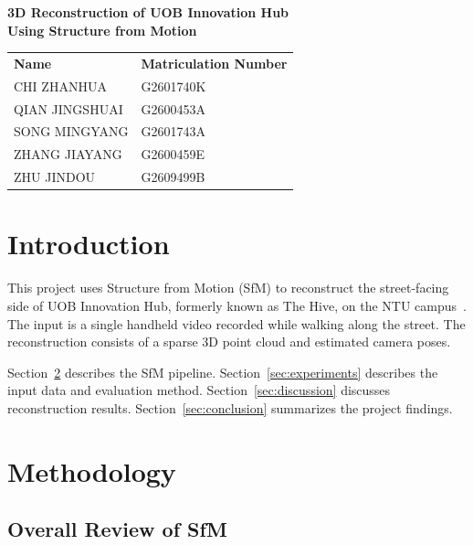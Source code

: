 \documentclass[11pt,a4paper]{article}
\begin{document}
\begin{titlepage}
  \centering
  \vspace*{\fill}
  {\LARGE\bfseries 3D Reconstruction of UOB Innovation Hub\\
    Using Structure from Motion\par}
  \vspace{3em}

  \begin{tabular}{@{}ll@{}}
    \textbf{Name} & \textbf{Matriculation Number} \\[0.6em]
    CHI ZHANHUA & G2601740K \\[0.4em]
    QIAN JINGSHUAI & G2600453A \\[0.4em]
    SONG MINGYANG & G2601743A \\[0.4em]
    ZHANG JIAYANG & G2600459E \\[0.4em]
    ZHU JINDOU & G2609499B \\
  \end{tabular}\par
  \vspace*{\fill}
\end{titlepage}

\section{Introduction}
\label{sec:introduction}

This project uses Structure from Motion (SfM) to reconstruct the street-facing side of UOB Innovation Hub, formerly known as The Hive, on the NTU campus~\cite{ntu_campus_art_trail}. The input is a single handheld video recorded while walking along the street. The reconstruction consists of a sparse 3D point cloud and estimated camera poses.

Section~\ref{sec:methodology} describes the SfM pipeline. Section~\ref{sec:experiments} describes the input data and evaluation method. Section~\ref{sec:discussion} discusses reconstruction results. Section~\ref{sec:conclusion} summarizes the project findings.

\section{Methodology}
\label{sec:methodology}

\subsection{Overall Review of SfM}
\label{sec:overall-sfm}
\end{document}

